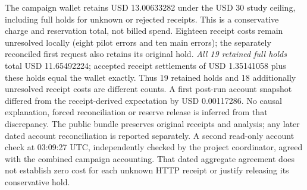 The campaign wallet retains USD 13.00633282 under the USD 30 study ceiling,
including full holds for unknown or rejected receipts. This is a conservative charge and
reservation total, not billed spend. Eighteen receipt costs remain unresolved
locally (eight pilot errors and ten main errors); the separately reconciled first
request also retains its original hold.
\emph{All 19 retained full holds} total USD 11.65492224; accepted receipt settlements
of USD 1.35141058 plus these holds equal the wallet exactly. Thus 19 retained
holds and 18 additionally unresolved receipt costs are different counts.
A first post-run account snapshot differed
from the receipt-derived expectation by USD 0.00117286. No causal explanation,
forced reconciliation or reserve release is inferred from that discrepancy.
The public bundle preserves original receipts and analysis; any later dated
account reconciliation is reported separately. A second read-only account check
at 03:09:27 UTC, independently checked by the project coordinator, agreed with the
combined campaign accounting. That dated aggregate agreement does not establish
zero cost for each unknown HTTP receipt or justify releasing its conservative hold.